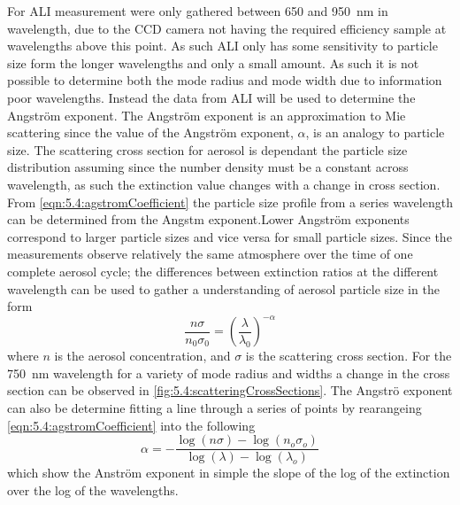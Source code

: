 For ALI measurement were only gathered between 650 and 950~nm in wavelength, due to the CCD camera not having the required efficiency sample at wavelengths above this point. As such ALI only has some sensitivity to particle size form the longer wavelengths and only a small amount. As such it is not possible to determine both the mode radius and mode width due to information poor wavelengths. Instead the data from ALI will be used to determine the Angstr\"{o}m exponent. The Angstr\"{o}m exponent is an approximation to Mie scattering since the value of the Angstr\"{o}m exponent, $\alpha$, is an analogy to particle size. The scattering cross section for aerosol is dependant the particle size distribution assuming since the number density must be a constant across wavelength, as such the extinction value changes with a change in cross section. From \autoref{eqn:5.4:agstromCoefficient} the particle size profile from a series wavelength can be determined from the Angstm exponent.Lower Angstr\"{o}m exponents correspond to larger particle sizes and vice versa for small particle sizes. Since the measurements observe relatively the same atmosphere over the time of one complete aerosol cycle; the differences between extinction ratios at the different wavelength can be used to gather a understanding of aerosol particle size in the form
\begin{equation}
    \frac{n\sigma}{n_{0}\sigma_{0}} = \left(\frac{\lambda}{\lambda_{0}}\right)^{-\alpha}
    \label{eqn:5.4:agstromCoefficient}
\end{equation}
where $n$ is the aerosol concentration, and $\sigma$ is the scattering cross section. For the 750~nm wavelength for a variety of mode radius and widths a change in the cross section can be observed in \autoref{fig:5.4:scatteringCrossSections}. The Angstr\"{o} exponent can also be determine  fitting a line through a series of points by rearangeing \autoref{eqn:5.4:agstromCoefficient} into the following
\begin{equation}
    \alpha = -\frac{\log(n\sigma)-\log(n_{o}\sigma_{o})}{\log(\lambda)-\log(\lambda_{o})}
    \label{eqn:5.4:agstromCoefficientSlope}
\end{equation}
which show the Anstr\"{o}m exponent in simple the slope of the log of the extinction over the log of the wavelengths.

